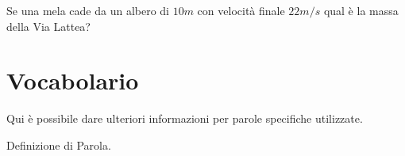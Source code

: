 \begin{problem}
Se una mela cade da un albero di $10m$ con velocità finale $22m/s$ qual è la massa della Via Lattea?
\end{problem}


\section{Vocabolario}

Qui è possibile dare ulteriori informazioni per parole specifiche utilizzate.

\begin{vocabulary}[Parola]
Definizione di Parola.
\end{vocabulary}